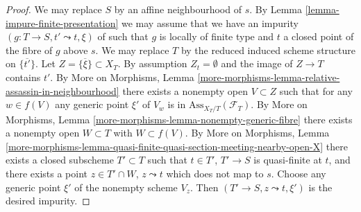 \documentclass[10pt,a4paper]{amsart}
\theoremstyle{plain}
\theoremstyle{definition}
\theoremstyle{remark}
\numberwithin{equation}{subsection}
\begin{document}
\begin{proof}
We may replace $S$ by an affine neighbourhood of $s$. By
Lemma \ref{lemma-impure-finite-presentation}
we may assume that we have an impurity $(g : T \to S, t' \leadsto t, \xi)$
of such that $g$ is locally of finite type and $t$ a closed point of the
fibre of $g$ above $s$. We may replace $T$ by the reduced induced
scheme structure on $\overline{\{t'\}}$. Let
$Z = \overline{\{\xi\}} \subset X_T$. By assumption $Z_t = \emptyset$
and the image of $Z \to T$ contains $t'$. By
More on Morphisms,
Lemma \ref{more-morphisms-lemma-relative-assassin-in-neighbourhood}
there exists a nonempty open $V \subset Z$ such that for any
$w \in f(V)$ any generic point $\xi'$ of $V_w$ is in
$\text{Ass}_{X_T/T}(\mathcal{F}_T)$. By
More on Morphisms, Lemma \ref{more-morphisms-lemma-nonempty-generic-fibre}
there exists a nonempty open $W \subset T$ with $W \subset f(V)$. By
More on Morphisms, Lemma
\ref{more-morphisms-lemma-quasi-finite-quasi-section-meeting-nearby-open-X}
there exists a closed subscheme $T' \subset T$ such that
$t \in T'$, $T' \to S$ is quasi-finite at $t$, and there exists a point
$z \in T' \cap W$, $z \leadsto t$ which does not map to $s$.
Choose any generic point $\xi'$ of the nonempty scheme $V_z$.
Then $(T' \to S, z \leadsto t, \xi')$ is the desired impurity.
\end{proof}
\end{document}
